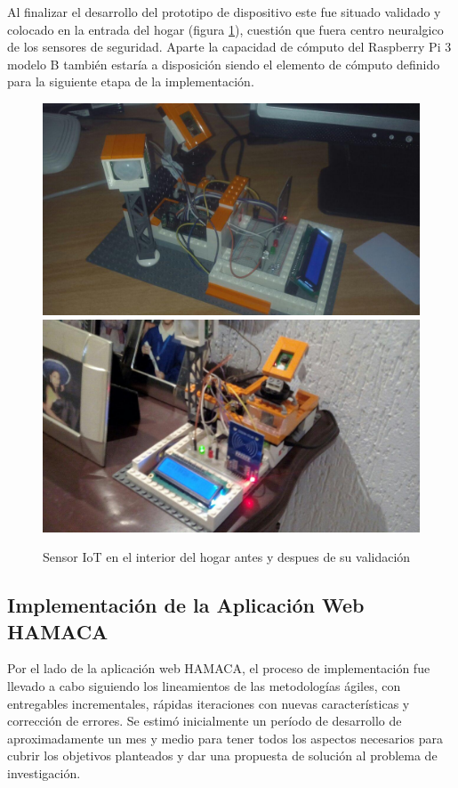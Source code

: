 Al finalizar el desarrollo del prototipo de dispositivo este fue situado validado y colocado en la entrada del hogar (figura \ref{fig:rpi3peter_zero}), cuestión que fuera centro neuralgico de los sensores de seguridad. Aparte la capacidad de cómputo del Raspberry Pi 3 modelo B también estaría a disposición siendo el elemento de cómputo definido para la siguiente etapa de la implementación.
\begin{figure}[!htb]
\centering
\includegraphics[scale=0.2]{./Figuras/rpi3peter_zero_proto.jpg}
\includegraphics[scale=0.15]{./Figuras/rpi3peter_zero.jpg}
\caption{Sensor IoT en el interior del hogar antes y despues de su validación}
\label{fig:rpi3peter_zero}
\vspace*{-10pt}
\end{figure}


\subsection{Implementación de la Aplicación Web HAMACA}
Por el lado de la aplicación web HAMACA, el proceso de implementación fue llevado a cabo siguiendo los lineamientos de las metodologías ágiles, con entregables incrementales, rápidas iteraciones con nuevas características y corrección de errores. Se estimó inicialmente un período de desarrollo de aproximadamente un mes y medio para tener todos los aspectos necesarios para cubrir los objetivos planteados y dar una propuesta de solución al problema de investigación.\\

